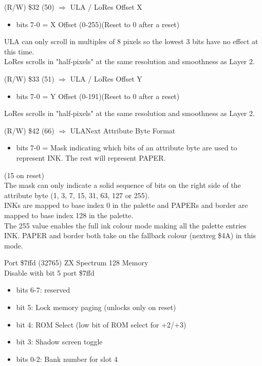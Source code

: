(R/W) \$32 (50) $\Rightarrow$ ULA / LoRes Offset X
\begin{itemize}
\item[] bits 7-0 = X Offset (0-255)(Reset to 0 after a reset)
\end{itemize}
ULA can only scroll in multiples of 8 pixels so the lowest 3 bits have
no effect at this time.\\
LoRes scrolls in "half-pixels" at the same resolution and smoothness
as Layer 2.

(R/W) \$33 (51) $\Rightarrow$ ULA / LoRes Offset Y
\begin{itemize}
\item[] bits 7-0 = Y Offset (0-191)(Reset to 0 after a reset)
\end{itemize}
LoRes scrolls in "half-pixels" at the same resolution and smoothness
as Layer 2.

(R/W) \$42 (66) $\Rightarrow$ ULANext Attribute Byte Format
\begin{itemize}
\item[] bits 7-0 = Mask indicating which bits of an attribute byte are
  used to represent INK. The rest will represent PAPER.
\end{itemize}
(15 on reset)\\
The mask can only indicate a solid sequence of bits on the right side
of the attribute byte (1, 3, 7, 15, 31, 63, 127 or 255).\\
INKs are mapped to base index 0 in the palette and PAPERs and border
are mapped to base index 128 in the palette.\\
The 255 value enables the full ink colour mode making all the palette
entries INK. PAPER and border both take on the fallback colour
(nextreg \$4A) in this mode.

Port \$7ffd (32765) ZX Spectrum 128 Memory\\
Disable with bit 5 port \$7ffd
\begin{itemize}
\item[] bits 6-7: reserved
\item[] bit 5: Lock memory paging (unlocks only on reset)
\item[] bit 4: ROM Select (low bit of ROM select for +2/+3)
\item[] bit 3: Shadow screen toggle
\item[] bits 0-2: Bank number for slot 4
\end{itemize}



